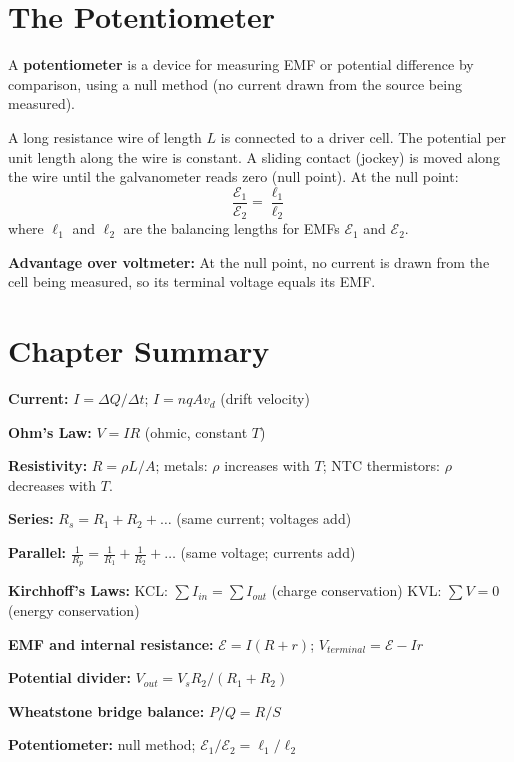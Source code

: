 \section{The Potentiometer}

\begin{definitionbox}[Potentiometer]
A \textbf{potentiometer} is a device for measuring
EMF or potential difference by comparison, using a
null method (no current drawn from the source being
measured).

A long resistance wire of length $L$ is connected
to a driver cell. The potential per unit length along
the wire is constant. A sliding contact (jockey) is
moved along the wire until the galvanometer reads
zero (null point). At the null point:
\[
  \frac{\mathcal{E}_1}{\mathcal{E}_2}
  = \frac{\ell_1}{\ell_2}
\]
where $\ell_1$ and $\ell_2$ are the balancing lengths
for EMFs $\mathcal{E}_1$ and $\mathcal{E}_2$.

\textbf{Advantage over voltmeter:} At the null point,
no current is drawn from the cell being measured, so
its terminal voltage equals its EMF.
\end{definitionbox}

\section{Chapter Summary}

\begin{summarybox}
\textbf{Current:} $I = \Delta Q/\Delta t$;
$I = nqAv_d$ (drift velocity)

\textbf{Ohm's Law:} $V = IR$ (ohmic, constant $T$)

\textbf{Resistivity:} $R = \rho L/A$;
metals: $\rho$ increases with $T$;
NTC thermistors: $\rho$ decreases with $T$.

\textbf{Series:} $R_s = R_1+R_2+\ldots$
(same current; voltages add)

\textbf{Parallel:}
$\frac{1}{R_p} = \frac{1}{R_1}+\frac{1}{R_2}+\ldots$
(same voltage; currents add)

\textbf{Kirchhoff's Laws:}
KCL: $\sum I_{in} = \sum I_{out}$ (charge conservation)
KVL: $\sum V = 0$ (energy conservation)

\textbf{EMF and internal resistance:}
$\mathcal{E} = I(R+r)$;
$V_{terminal} = \mathcal{E} - Ir$

\textbf{Potential divider:}
$V_{out} = V_s R_2/(R_1+R_2)$

\textbf{Wheatstone bridge balance:}
$P/Q = R/S$

\textbf{Potentiometer:} null method;
$\mathcal{E}_1/\mathcal{E}_2 = \ell_1/\ell_2$
\end{summarybox}

